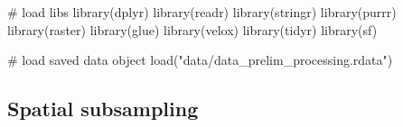 \documentclass[]{article}
\newenvironment{Shaded}{}{}
\newcommand{\CommentTok}[1]{\textcolor[rgb]{0.00,0.50,0.00}{#1}}
\newcommand{\KeywordTok}[1]{\textcolor[rgb]{0.00,0.00,1.00}{#1}}
\newcommand{\NormalTok}[1]{#1}
\newcommand{\StringTok}[1]{\textcolor[rgb]{0.00,0.50,0.50}{#1}}
\begin{document}
\begin{Shaded}
\begin{Highlighting}[]

\CommentTok{# load libs}
\KeywordTok{library}\NormalTok{(dplyr)}
\KeywordTok{library}\NormalTok{(readr)}
\KeywordTok{library}\NormalTok{(stringr)}
\KeywordTok{library}\NormalTok{(purrr)}
\KeywordTok{library}\NormalTok{(raster)}
\KeywordTok{library}\NormalTok{(glue)}
\KeywordTok{library}\NormalTok{(velox)}
\KeywordTok{library}\NormalTok{(tidyr)}
\KeywordTok{library}\NormalTok{(sf)}

\CommentTok{# load saved data object}
\KeywordTok{load}\NormalTok{(}\StringTok{"data/data_prelim_processing.rdata"}\NormalTok{)}
\end{Highlighting}
\end{Shaded}

\hypertarget{spatial-subsampling}{%
\subsection{Spatial subsampling}\label{spatial-subsampling}}
\end{document}
